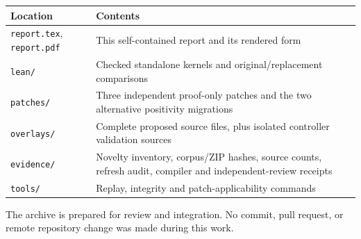 \documentclass[11pt]{article}
\newcommand{\code}[1]{\nolinkurl{#1}}
\begin{document}
\begin{tabularx}{\linewidth}{@{}lY@{}}
\toprule
Location & Contents\\
\midrule
\code{report.tex}, \code{report.pdf} & This self-contained report and its rendered form\\
\code{lean/} & Checked standalone kernels and original/replacement comparisons\\
\code{patches/} & Three independent proof-only patches and the two alternative positivity migrations\\
\code{overlays/} & Complete proposed source files, plus isolated controller validation sources\\
\code{evidence/} & Novelty inventory, corpus/ZIP hashes, source counts, refresh audit, compiler and independent-review receipts\\
\code{tools/} & Replay, integrity and patch-applicability commands\\
\bottomrule
\end{tabularx}

\vspace{5pt}
The archive is prepared for review and integration. No commit, pull request, or remote repository change was made during this work.
\end{document}
